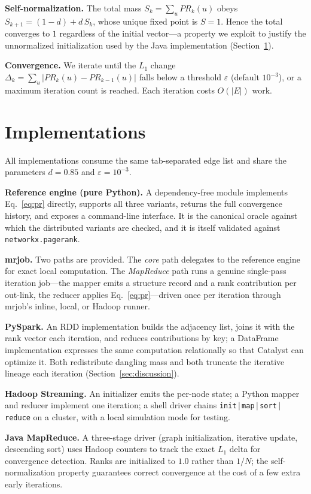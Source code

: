 \textbf{Self-normalization.} The total mass $S_k=\sum_u PR_k(u)$ obeys
$S_{k+1}=(1-d)+d\,S_k$, whose unique fixed point is $S=1$. Hence the total
converges to $1$ regardless of the initial vector---a property we exploit to
justify the unnormalized initialization used by the Java implementation
(Section~\ref{sec:impl}).

\textbf{Convergence.} We iterate until the $L_1$ change
$\Delta_k=\sum_u|PR_{k}(u)-PR_{k-1}(u)|$ falls below a threshold $\varepsilon$
(default $10^{-3}$), or a maximum iteration count is reached. Each iteration
costs $O(|E|)$ work.

\section{Implementations}
\label{sec:impl}
All implementations consume the same tab-separated edge list and share the
parameters $d=0.85$ and $\varepsilon=10^{-3}$.

\textbf{Reference engine (pure Python).} A dependency-free module implements
Eq.~\eqref{eq:pr} directly, supports all three variants, returns the full
convergence history, and exposes a command-line interface. It is the canonical
oracle against which the distributed variants are checked, and it is itself
validated against \texttt{networkx.pagerank}.

\textbf{mrjob.} Two paths are provided. The \emph{core} path delegates to the
reference engine for exact local computation. The \emph{MapReduce} path runs a
genuine single-pass iteration job---the mapper emits a structure record and a
rank contribution per out-link, the reducer applies Eq.~\eqref{eq:pr}---driven
once per iteration through mrjob's inline, local, or Hadoop runner.

\textbf{PySpark.} An RDD implementation builds the adjacency list, joins it with
the rank vector each iteration, and reduces contributions by key; a DataFrame
implementation expresses the same computation relationally so that Catalyst can
optimize it. Both redistribute dangling mass and both truncate the iterative
lineage each iteration (Section~\ref{sec:discussion}).

\textbf{Hadoop Streaming.} An initializer emits the per-node state; a Python
mapper and reducer implement one iteration; a shell driver chains
\texttt{init$\,|\,$map$\,|\,$sort$\,|\,$reduce} on a cluster, with a local
simulation mode for testing.

\textbf{Java MapReduce.} A three-stage driver (graph initialization, iterative
update, descending sort) uses Hadoop counters to track the exact $L_1$ delta for
convergence detection. Ranks are initialized to $1.0$ rather than $1/N$; the
self-normalization property guarantees correct convergence at the cost of a few
extra early iterations.

